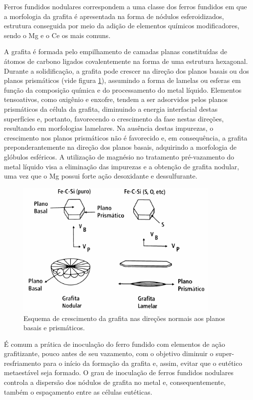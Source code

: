 Ferros fundidos nodulares correspondem a uma classe dos ferros fundidos em que a morfologia da grafita é apresentada na forma de nódulos esferoidizados, estrutura conseguida por meio da adição de elementos químicos modificadores, sendo o Mg e o Ce os mais comuns.

A grafita é formada pelo empilhamento de camadas planas constituídas de átomos de carbono ligados covalentemente na forma de uma estrutura hexagonal. Durante a solidificação, a grafita pode crescer na direção dos planos basais ou dos planos prismáticos (vide figura \ref{fig:grafita}), assumindo a forma de lamelas ou esferas em função da composição química e do processamento do metal líquido. Elementos tensoativos, como oxigênio e enxofre, tendem a ser adsorvidos pelos planos prismáticos da célula da grafita, diminuindo a energia interfacial destas superfícies e, portanto, favorecendo o crescimento da fase nestas direções, resultando em morfologias lamelares. Na ausência destas impurezas, o crescimento nos planos prismáticos não é favorecido e, em consequência, a grafita preponderantemente na direção dos planos basais, adquirindo a morfologia de glóbulos esféricos. A utilização de magnésio no tratamento pré-vazamento do metal líquido visa a eliminação das impurezas e a obtenção de grafita nodular, uma vez que o Mg possui forte ação desoxidante e dessulfurante\cite{Labrecque1998,Guesser2009}.

\begin{figure}
	\includegraphics[width=10cm]{img/grafita.pdf}
	\caption{Esquema de crescimento da grafita nas direções normais aos planos basais e prismáticos\cite{Guesser2009}.}
	\label{fig:grafita}
\end{figure}

É comum a prática de inoculação do ferro fundido com elementos de ação grafitizante, pouco antes de seu vazamento, com o objetivo diminuir o super-resfriamento para o início da formação da grafita e, assim, evitar que o eutético metaestável seja formado\cite{Santos1991}. O grau de inoculação de ferros fundidos nodulares controla a dispersão dos nódulos de grafita no metal e, consequentemente, também o espaçamento entre as células eutéticas.

